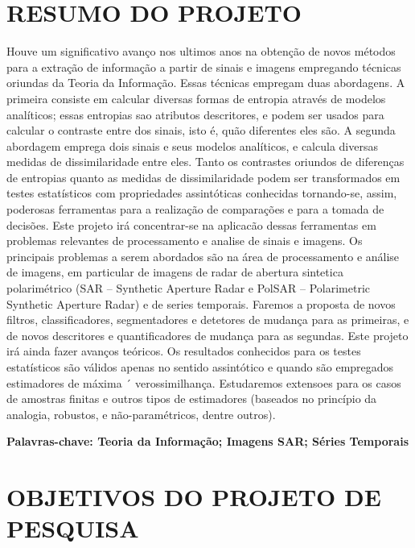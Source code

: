 \documentclass[12pt]{article}
\begin{document}
\hrulefill   


\newpage
\section*{\centering \textbf{RESUMO DO PROJETO}}

\vspace{0.2cm}

Houve um significativo avanço nos ultimos anos na obtenção de novos métodos para a extração de informação a partir de sinais e imagens empregando técnicas oriundas da Teoria da Informação. Essas técnicas empregam duas abordagens. A primeira consiste em calcular diversas formas de entropia através de modelos analíticos; essas entropias sao atributos descritores, e podem ser usados para calcular o contraste entre dos sinais, isto é, quão diferentes eles são. A segunda abordagem emprega dois sinais e seus modelos analíticos, e calcula diversas medidas de dissimilaridade entre eles. Tanto os contrastes oriundos de diferenças de entropias quanto as medidas de dissimilaridade podem ser transformados em testes estatísticos com propriedades assintóticas conhecidas tornando-se, assim, poderosas ferramentas para a realização de comparações e para a tomada de decisões. Este projeto irá concentrar-se na aplicacão dessas ferramentas em problemas relevantes de processamento e analise de sinais e imagens. Os principais problemas a serem abordados são na área de processamento e análise de imagens, em particular de imagens de radar de abertura sintetica polarimétrico (SAR -- Synthetic Aperture Radar e PolSAR -- Polarimetric
Synthetic Aperture Radar) e de series temporais. Faremos a proposta de novos filtros, classificadores, segmentadores e detetores de mudança para as primeiras, e de novos descritores e quantificadores de mudança para as segundas. Este projeto irá ainda fazer avanços teóricos. Os resultados conhecidos para os testes estatísticos são válidos apenas no sentido assintótico e quando são empregados estimadores de máxima ´
verossimilhança. Estudaremos extensoes para os casos de amostras finitas e outros tipos de estimadores (baseados no princípio da analogia, robustos, e não-paramétricos, dentre outros).


\textbf{Palavras-chave: Teoria da Informação; Imagens SAR; Séries Temporais} 


\newpage
\section*{\centering \textbf{OBJETIVOS DO PROJETO DE PESQUISA}}
\end{document}
